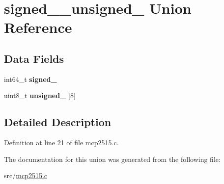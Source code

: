 \hypertarget{unionsigned__64__unsigned__8}{}\section{signed\+\_\+\_\+unsigned\+\_ Union Reference}
\label{unionsigned__64__unsigned__8}
\subsection*{Data Fields}
\begin{DoxyCompactItemize}
\item 
\mbox{\label{unionsigned__64__unsigned__8_a0968ab139966466dc8a59ebca8b8aadc}} 
int64\+\_\+t {\bfseries signed\+\_}
\item 
\mbox{\label{unionsigned__64__unsigned__8_a53b4a4836b045a7427b9e9c3f7d1d0a0}} 
uint8\+\_\+t {\bfseries unsigned\+\_} \mbox{[}8\mbox{]}
\end{DoxyCompactItemize}


\subsection{Detailed Description}


Definition at line 21 of file mcp2515.\+c.



The documentation for this union was generated from the following file\+:\begin{DoxyCompactItemize}
\item 
src/\hyperlink{mcp2515_8c}{mcp2515.\+c}\end{DoxyCompactItemize}
